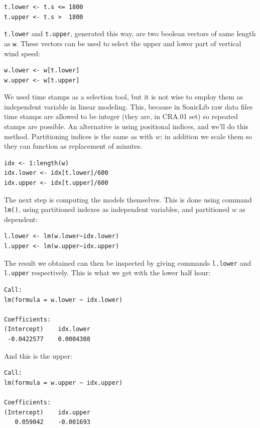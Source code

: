 \documentclass[a4paper,10pt]{book}
\begin{document}
\begin{verbatim}
t.lower <- t.s <= 1800
t.upper <- t.s >  1800
\end{verbatim}

\verb|t.lower| and \verb|t.upper|, generated this way, are two boolean vectors of same length as \verb|w|. These vectors can be used to select the upper and lower part of vertical wind speed:

\begin{verbatim}
w.lower <- w[t.lower]
w.upper <- w[t.upper]
\end{verbatim}

We used time stamps as a selection tool, but it is not wise to employ them as independent variable in linear modeling. This, because in SonicLib raw data files time stamps are allowed to be integer (they are, in CRA.01 set) so repeated stamps are possible. An alternative is using positional indices, and we'll do this method. Partitioning indices is the same as with $w$; in addition we scale them so they can function as replacement of minutes.

\begin{verbatim}
idx <- 1:length(w)
idx.lower <- idx[t.lower]/600
idx.upper <- idx[t.upper]/600
\end{verbatim}

The next step is computing the models themselves. This is done using command \verb|lm()|, using partitioned indexes as independent variables, and partitioned $w$ as dependent:

\begin{verbatim}
l.lower <- lm(w.lower~idx.lower)
l.upper <- lm(w.upper~idx.upper)
\end{verbatim}

The result we obtained can then be inspected by giving commands \verb|l.lower| and \verb|l.upper| respectively. This is what we get with the lower half hour:

\begin{verbatim}
Call:
lm(formula = w.lower ~ idx.lower)

Coefficients:
(Intercept)    idx.lower  
 -0.0422577    0.0004308
\end{verbatim}

\noindent And this is the upper:

\begin{verbatim}
Call:
lm(formula = w.upper ~ idx.upper)

Coefficients:
(Intercept)    idx.upper  
   0.059042    -0.001693
\end{verbatim}
\end{document}
